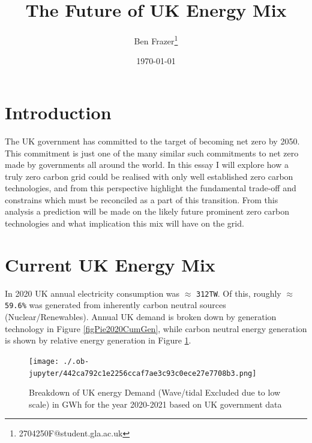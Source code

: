 \documentclass[11pt]{article}
\author{Ben Frazer\thanks{2704250F@student.gla.ac.uk}}
\date{\today}
\title{The Future of UK Energy Mix}
\numberwithin{equation}{section}
\begin{document}
\maketitle
\tableofcontents

\section{Introduction}
\label{sec:org6c83099}
The UK government has committed to the target of becoming net zero by 2050. This commitment is just one of the many similar such commitments to net zero made by governments all around the world. In this essay I will explore how a truly zero carbon grid could be realised with only well established zero carbon technologies, and from this perspective highlight the fundamental trade-off and constrains which must be reconciled as a part of this transition. From this analysis a prediction will be made on the likely future prominent zero carbon technologies and what implication this mix will have on the grid.
\section{Current UK Energy Mix \label{secCurrentUkEnergyMix}}
\label{sec:org0e70717}
In 2020 UK annual electricity consumption was \(\approx\) \texttt{312TW}. Of this, roughly \(\approx\) \texttt{59.6\%} was generated from inherently carbon neutral sources (Nuclear/Renewables). Annual UK demand is broken down by generation technology in Figure \ref{figPie2020CumGen}, while carbon neutral energy generation is shown by relative energy generation in Figure \ref{figPie2020CumGen_all}.

\begin{figure}[H]
\centering
\texttt{[image: ./.ob-jupyter/442ca792c1e2256ccaf7ae3c93c0ece27e7708b3.png]}
\caption{\label{figPie2020CumGen_all}Breakdown of UK energy Demand (Wave/tidal Excluded due to low scale) in GWh for the year 2020-2021 based on UK government data \cite{RenewableElecricityCap}}
\end{figure}
\end{document}
